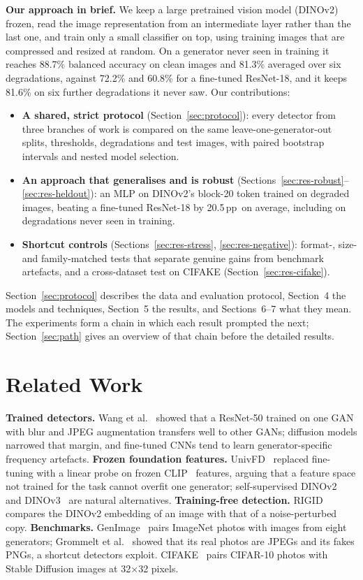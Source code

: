 \documentclass[10pt,a4paper]{article}
\newcommand{\pp}{\,pp}
\begin{document}
\textbf{Our approach in brief.} We keep a large pretrained vision model (DINOv2) frozen, read the image representation from an intermediate layer rather than the last one, and train only a small classifier on top, using training images that are compressed and resized at random. On a generator never seen in training it reaches 88.7\% balanced accuracy on clean images and 81.3\% averaged over six degradations, against 72.2\% and 60.8\% for a fine-tuned ResNet-18, and it keeps 81.6\% on six further degradations it never saw. Our contributions:
\begin{itemize}
  \item \textbf{A shared, strict protocol} (Section~\ref{sec:protocol}): every detector from three branches of work is compared on the same leave-one-generator-out splits, thresholds, degradations and test images, with paired bootstrap intervals and nested model selection.
  \item \textbf{An approach that generalises and is robust} (Sections~\ref{sec:res-robust}--\ref{sec:res-heldout}): an MLP on DINOv2's block-20 token trained on degraded images, beating a fine-tuned ResNet-18 by 20.5\pp\ on average, including on degradations never seen in training.
  \item \textbf{Shortcut controls} (Sections~\ref{sec:res-stress}, \ref{sec:res-negative}): format-, size- and family-matched tests that separate genuine gains from benchmark artefacts, and a cross-dataset test on CIFAKE (Section~\ref{sec:res-cifake}).
\end{itemize}
Section~\ref{sec:protocol} describes the data and evaluation protocol, Section~4 the models and techniques, Section~5 the results, and Sections~6--7 what they mean. The experiments form a chain in which each result prompted the next; Section~\ref{sec:path} gives an overview of that chain before the detailed results.

\section{Related Work}
\textbf{Trained detectors.} Wang et al.~\cite{wang2020cnn} showed that a ResNet-50 trained on one GAN with blur and JPEG augmentation transfers well to other GANs; diffusion models narrowed that margin, and fine-tuned CNNs tend to learn generator-specific frequency artefacts. \textbf{Frozen foundation features.} UnivFD~\cite{ojha2023univfd} replaced fine-tuning with a linear probe on frozen CLIP~\cite{radford2021clip} features, arguing that a feature space not trained for the task cannot overfit one generator; self-supervised DINOv2~\cite{oquab2024dinov2} and DINOv3~\cite{simeoni2025dinov3} are natural alternatives. \textbf{Training-free detection.} RIGID~\cite{he2024rigid} compares the DINOv2 embedding of an image with that of a noise-perturbed copy. \textbf{Benchmarks.} GenImage~\cite{zhu2023genimage} pairs ImageNet photos with images from eight generators; Grommelt et al.~\cite{grommelt2024fake} showed that its real photos are JPEGs and its fakes PNGs, a shortcut detectors exploit. CIFAKE~\cite{bird2024cifake} pairs CIFAR-10 photos with Stable Diffusion images at 32$\times$32 pixels.
\end{document}
